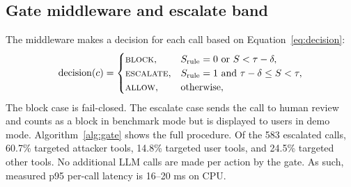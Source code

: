 \documentclass[a4paper,conference]{IEEEtran}
\begin{document}
\subsection{Gate middleware and escalate band}
The middleware makes a decision for each call based on Equation~\ref{eq:decision}:
\begin{equation}
  \mathrm{decision}(c) =
  \begin{cases}
    \text{\textsc{block}},    & S_{\mathrm{rule}}=0 \ \text{or}\ S < \tau-\delta,           \\
    \text{\textsc{escalate}}, & S_{\mathrm{rule}}=1 \ \text{and}\ \tau-\delta \le S < \tau, \\
    \text{\textsc{allow}},    & \text{otherwise},
  \end{cases} \label{eq:decision}
\end{equation}
The block case is fail-closed. The escalate case sends the call to human review and counts as a block in benchmark mode but is displayed to users in demo mode. Algorithm~\ref{alg:gate} shows the full procedure. Of the 583 escalated calls, 60.7\% targeted attacker tools, 14.8\% targeted user tools, and 24.5\% targeted other tools. No additional LLM calls are made per action by the gate. As such, measured p95 per-call latency is 16--20 ms on CPU.
\end{document}
